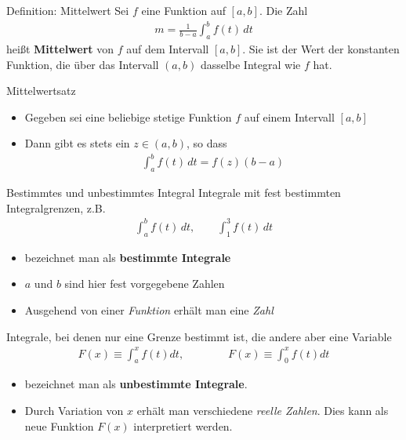 \begin{frame}{Definition: Mittelwert}
    Sei $f$ eine Funktion auf $[a,b]$. Die Zahl
    \begin{gather*}
        m = \frac{1}{b-a} \int_a^b f(t)\,dt
    \end{gather*}
    heißt \textbf{Mittelwert} von $f$ auf dem Intervall $[a,b]$. Sie ist der Wert der konstanten Funktion, die über das Intervall $(a,b)$ dasselbe Integral wie $f$ hat.
\end{frame}
\begin{frame}{Mittelwertsatz}
        \begin{itemize}
            \item Gegeben sei eine beliebige stetige Funktion $f$ auf einem Intervall $[a,b]$
            \item<+-> Dann gibt es stets ein $z\in(a,b)$, so dass
            \begin{gather*}
                \int_a^b f(t)\, dt = f(z)(b-a)
            \end{gather*}
        \end{itemize}
\end{frame}

\begin{frame}{Bestimmtes und unbestimmtes Integral}
    Integrale mit fest bestimmten Integralgrenzen, z.B.
    \begin{gather*}
        \int_a^bf(t) \,dt, \qquad \int_1^3f(t)\,dt
    \end{gather*}
    \begin{itemize} 
        \item bezeichnet man als \textbf{bestimmte Integrale}
        \item $a$ und $b$ sind hier fest vorgegebene Zahlen
        \item Ausgehend von einer \textit{Funktion} erhält man eine \textit{Zahl}
    \end{itemize}
    \pause
    Integrale, bei denen nur eine Grenze bestimmt ist, die andere aber eine Variable
    \begin{gather*}
        F(x) \equiv \int_a^x f(t) dt, \qquad\qquad F(x) \equiv \int_0^x f(t)dt
    \end{gather*}
    \begin{itemize} 
        \item bezeichnet man als \textbf{unbestimmte Integrale}.
        \item Durch Variation von $x$ erhält man verschiedene \textit{reelle Zahlen}. Dies kann als neue Funktion $F(x)$ interpretiert werden.
    \end{itemize}
\end{frame}



